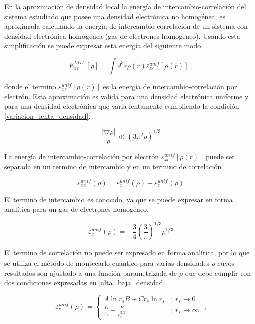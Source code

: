 En la aproximaci\'on de densidad local la energ\'ia de 
intercambio-correlaci\'on del 
sistema estudiado que posee una densidad electr\'onica no homog\'enea, es 
aproximada calculando la energ\'ia de intercambio-correlaci\'on de un sistema 
con densidad electr\'onica homog\'enea (gas de electrones homogeneo). Usando 
esta simplificaci\'on se puede expresar esta energ\'ia del siguiente modo.

\begin{equation}
E_{xc}^{LDA} [\rho ] = \int d^{3}r \rho (r) \varepsilon _{xc}^{unif} [\rho 
(r)] \textrm{ ,}
\end{equation}

\noindent donde el termino $\varepsilon _{xc}^{unif} [\rho (r)]$ es la 
energ\'ia de 
intercambio-correlaci\'on por electr\'on. Esta aproximaci\'on es valida para 
una densidad electr\'onica uniforme y para una densidad electr\'onica que varia 
lentamente cumpliendo la condici\'on \ref{variacion_lenta_densidad}.

\begin{equation} \label{variacion_lenta_densidad}
\frac{|\bigtriangledown \rho |}{\rho } \ll (3 \pi ^{2} \rho)^{1/3}
\end{equation}

\noindent La energ\'ia de intercambio-correlaci\'on por electr\'on $\varepsilon 
_{xc}^{unif} [\rho (r)]$ puede ser separada en un termino de intercambio y en 
un termino de correlaci\'on

\begin{equation}
   \varepsilon _{xc}^{unif} (\rho ) = \varepsilon _{x}^{unif} (\rho ) + 
   \varepsilon _{c}^{unif} (\rho )
\end{equation}

\noindent El termino de intercambio es conocido, ya que se puede expresar en 
forma 
anal\'itica para un gas de electrones homog\'eneo. 

\begin{equation}
   \varepsilon _{x}^{unif} (\rho ) = -\frac{3}{4} \left( \frac{3}{\pi } \right) 
   ^{1/3} \rho ^{1/3}
\end{equation}

\noindent El termino de correlaci\'on no puede ser expresado en forma 
anal\'itica, por lo 
que se utiliza el m\'etodo de montecarlo cu\'antico para varias densidades 
$\rho $ cuyos resultados son ajustado a una funci\'on parametrizada de $\rho $ 
que debe cumplir con dos condiciones expresadas en \ref{alta_baja_densidad}

\begin{equation} \label{alta_baja_densidad}
    \varepsilon _{c}^{unif} (\rho ) = \left\{ \begin{array}{ll}
    A \ln r_{s} B + C r_{s} \ln r_{s} & \textrm{; } r_{s} \to 0 \\ 
    \frac{D}{r_{s}} + \frac{E}{r_{s}^{3/2}} & \textrm{; } r_{s} \to \infty
    \end{array} \right. \textrm{ ,}
\end{equation}

